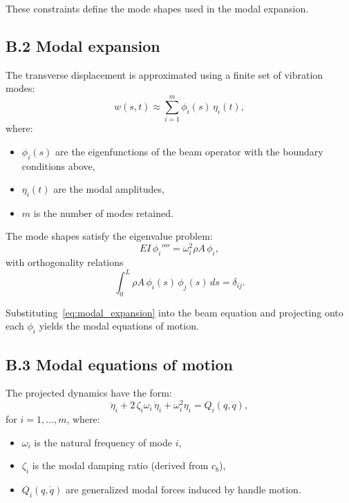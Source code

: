 \documentclass[12pt]{article}
\begin{document}
These constraints define the mode shapes used in the modal expansion.

\subsection{B.2 \quad Modal expansion}

The transverse displacement is approximated using a finite set of vibration modes:
\begin{equation}
  w(s,t)
  \approx
  \sum_{i=1}^{m} \phi_i(s)\,\eta_i(t),
  \label{eq:modal_expansion}
\end{equation}
where:
\begin{itemize}
  \item \(\phi_i(s)\) are the eigenfunctions of the beam operator with the boundary conditions above,
  \item \(\eta_i(t)\) are the modal amplitudes,
  \item \(m\) is the number of modes retained.
\end{itemize}

The mode shapes satisfy the eigenvalue problem:
\[
  EI \,\phi_i'''' = \omega_i^2 \rho A \,\phi_i,
\]
with orthogonality relations
\[
  \int_0^L \rho A \,\phi_i(s)\,\phi_j(s)\,ds = \delta_{ij}.
\]

Substituting~\eqref{eq:modal_expansion} into the beam equation and projecting onto each \(\phi_i\) yields the modal equations of motion.

\subsection{B.3 \quad Modal equations of motion}

The projected dynamics have the form:
\begin{equation}
  \ddot{\eta}_i
  + 2\,\zeta_i \omega_i\,\dot{\eta}_i
  + \omega_i^2 \eta_i
  =
  Q_i(q,\dot{q}),
  \label{eq:modal_eom_single}
\end{equation}
for \(i = 1,\dots,m\), where:
\begin{itemize}
  \item \(\omega_i\) is the natural frequency of mode \(i\),
  \item \(\zeta_i\) is the modal damping ratio (derived from \(c_b\)),
  \item \(Q_i(q,\dot{q})\) are generalized modal forces induced by handle motion.
\end{itemize}
\end{document}
